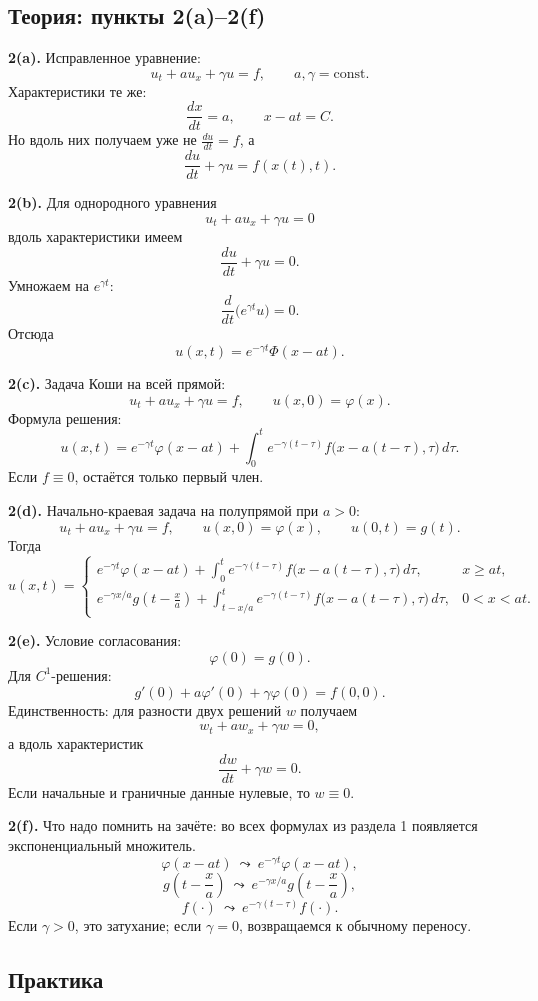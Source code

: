 \documentclass[a4paper,12pt]{article}
\begin{document}
\subsection{Теория: пункты 2(a)--2(f)}

\textbf{2(a).} Исправленное уравнение:
\[
u_t+a u_x+\gamma u=f,
\qquad a,\gamma=\mathrm{const}.
\]
Характеристики те же:
\[
\frac{dx}{dt}=a,
\qquad x-at=C.
\]
Но вдоль них получаем уже не $\frac{du}{dt}=f$, а
\[
\frac{du}{dt}+\gamma u=f(x(t),t).
\]

\textbf{2(b).} Для однородного уравнения
\[
u_t+a u_x+\gamma u=0
\]
вдоль характеристики имеем
\[
\frac{du}{dt}+\gamma u=0.
\]
Умножаем на $e^{\gamma t}$:
\[
\frac{d}{dt}\bigl(e^{\gamma t}u\bigr)=0.
\]
Отсюда
\[
u(x,t)=e^{-\gamma t}\Phi(x-at).
\]

\textbf{2(c).} Задача Коши на всей прямой:
\[
u_t+a u_x+\gamma u=f,
\qquad
u(x,0)=\varphi(x).
\]
Формула решения:
\[
u(x,t)=e^{-\gamma t}\varphi(x-at)
+\int_0^t e^{-\gamma(t-\tau)}f\bigl(x-a(t-\tau),\tau\bigr)\,d\tau.
\]
Если $f\equiv 0$, остаётся только первый член.

\textbf{2(d).} Начально-краевая задача на полупрямой при $a>0$:
\[
u_t+a u_x+\gamma u=f,
\qquad
u(x,0)=\varphi(x),
\qquad
u(0,t)=g(t).
\]
Тогда
\[
u(x,t)=
\begin{cases}
\displaystyle
e^{-\gamma t}\varphi(x-at)
+\int_0^t e^{-\gamma(t-\tau)}f\bigl(x-a(t-\tau),\tau\bigr)\,d\tau,
& x\ge at,
\\[1.2em]
\displaystyle
e^{-\gamma x/a}g\!\left(t-\frac{x}{a}\right)
+\int_{t-x/a}^t e^{-\gamma(t-\tau)}f\bigl(x-a(t-\tau),\tau\bigr)\,d\tau,
& 0<x<at.
\end{cases}
\]

\textbf{2(e).} Условие согласования:
\[
\varphi(0)=g(0).
\]
Для $C^1$-решения:
\[
g'(0)+a\varphi'(0)+\gamma\varphi(0)=f(0,0).
\]
Единственность: для разности двух решений $w$ получаем
\[
w_t+a w_x+\gamma w=0,
\]
а вдоль характеристик
\[
\frac{dw}{dt}+\gamma w=0.
\]
Если начальные и граничные данные нулевые, то $w\equiv 0$.

\textbf{2(f).} Что надо помнить на зачёте: во всех формулах из раздела 1 появляется экспоненциальный множитель.
\[
\varphi(x-at)\ \leadsto\ e^{-\gamma t}\varphi(x-at),
\]
\[
g\!\left(t-\frac xa\right)\ \leadsto\ e^{-\gamma x/a}g\!\left(t-\frac xa\right),
\]
\[
f(\cdot)\ \leadsto\ e^{-\gamma(t-\tau)}f(\cdot).
\]
Если $\gamma>0$, это затухание; если $\gamma=0$, возвращаемся к обычному переносу.

\subsection{Практика}
\end{document}
